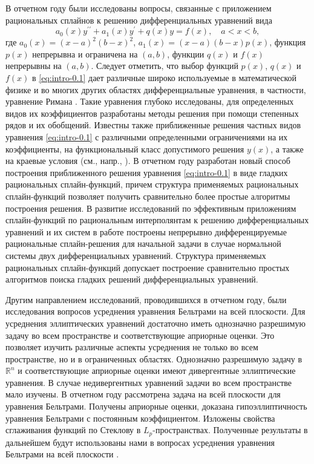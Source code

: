 В отчетном году были исследованы вопросы, связанные с приложением рациональных сплайнов к решению дифференциальных уравнений вида
\begin{equation}\label{eq:intro-0.1}
a_0(x) y^{\prime\prime}+a_1(x) y^\prime+q(x) y=f(x),\quad a< x<b,
\end{equation}
где $a_0(x)=(x-a)^2(b-x)^2$, $a_1(x)=(x-a)(b-x)p(x)$, функция $p(x)$ непрерывна и ограничена на $(a,b)$, функции $q(x)$ и $f(x)$ непрерывны на $(a,b)$.
Следует отметить, что выбор функций $p(x)$, $q(x)$ и $f(x)$ в \eqref{eq:intro-0.1} дает различные широко используемые в математической физике и во многих других областях дифференциальные уравнения, в частности, уравнение Римана \cite{bib:ark-1, bib:ark-2, bib:ark-3}. Такие уравнения глубоко
исследованы, для определенных видов их коэффициентов разработаны методы решения при помощи степенных рядов и их обобщений.
Известны также приближенные решения частных видов уравнения \eqref{eq:intro-0.1} с различными
определенными ограничениями на их коэффициенты, на функциональный класс допустимого
решения $y(x)$, а также на краевые условия (см., напр.,  \cite{bib:ark-4, bib:ark-5, bib:ark-6, bib:ark-7, bib:ark-8, bib:ark-9, bib:ark-10}).
В отчетном году разработан новый способ построения приближенного решения уравнения
\eqref{eq:intro-0.1} в виде гладких рациональных сплайн-функций, причем структура применяемых
рациональных сплайн-функций позволяет получить сравнительно более простые алгоритмы
построения решения.
В развитие исследований по эффективным приложениям сплайн-функций по рациональным
 интерполянтам к решению дифференциальных уравнений и их систем в работе \cite{bib:ark-19}
 построены непрерывно дифференцируемые рациональные сплайн-решения
 для начальной задачи в случае нормальной системы двух дифференциальных уравнений.
Структура применяемых рациональных сплайн-функций допускает построение сравнительно
простых алгоритмов поиска гладких решений дифференциальных уравнений.

Другим направлением исследований, проводившихся в отчетном году, были исследования вопросов усреднения уравнения Бельтрами на всей плоскости.
Для усреднения эллиптических уравнений достаточно иметь однозначно разрешимую задачу во всем пространстве и соответствующие априорные оценки. Это позволяет изучить различные  аспекты усреднения не только во всем пространстве, но и в ограниченных областях. Однозначно разрешимую задачу в $\mathbb{R}^n$ и соответствующие априорные оценки имеют дивергентные эллиптические уравнения. В случае недивергентных уравнений задачи во всем пространстве мало изучены.
В отчетном году рассмотрена задача на всей плоскости для уравнения Бельтрами. Получены априорные оценки, доказана гипоэллиптичность уравнения Бельтрами с постоянным коэффициентом. Изложены свойства сглаживания функций по Стеклову в $L_p$-пространствах. Полученные результаты в дальнейшем будут использованы нами в вопросах усреднения уравнения Бельтрами на всей плоскости .

